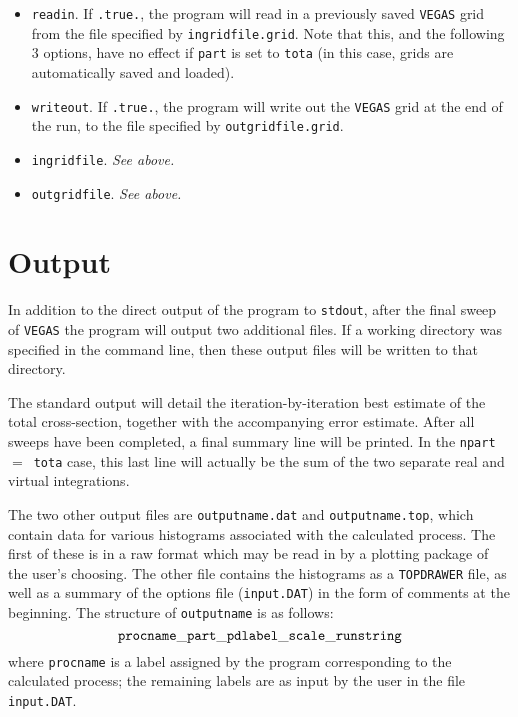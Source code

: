 \documentclass[12pt]{article}
\begin{document}
\begin{itemize}
\item {\tt readin}. If {\tt .true.}, the program will read in a
previously saved {\tt VEGAS} grid from the file specified by
{\tt ingridfile.grid}. Note that this, and the following 3 options,
have no effect if {\tt part} is set to {\tt tota} (in this case, grids
are automatically saved and loaded).

\item {\tt writeout}. If {\tt .true.}, the program will write out
the {\tt VEGAS} grid at the end of the run, to the file specified by
{\tt outgridfile.grid}.

\item {\tt ingridfile}.  {\it See above.}

\item {\tt outgridfile}.  {\it See above.}

\end{itemize}

\section{Output}
 
In addition to the direct output of the program to {\tt stdout}, after
the final sweep of {\tt VEGAS} the program will output two additional files.
If a working directory was specified in the command line, then these
output files will be written to that directory.

The standard output will detail the iteration-by-iteration best estimate
of the total cross-section, together with the accompanying error estimate.
After all sweeps have been completed, a final summary line will be printed.
In the {\tt npart}~$=$~{\tt tota} case, this last line will actually be the
sum of the two separate real and virtual integrations.

The two other output files are {\tt outputname.dat} and
{\tt outputname.top}, which contain data for various histograms associated
with the calculated process. The first of these is in a raw format 
which may be read in by a plotting package of the user's choosing. The
other file contains the histograms as a {\tt TOPDRAWER} file, as well
as a summary of the options file ({\tt input.DAT}) in the form of
comments at the beginning. The structure
of {\tt outputname} is as follows:
\begin{displaymath}
{\tt procname\_part\_pdlabel\_scale\_runstring}
\end{displaymath}
where {\tt procname} is a label assigned by the program corresponding to
the calculated process; the remaining labels are as input by the user
in the file {\tt input.DAT}.
\end{document}
